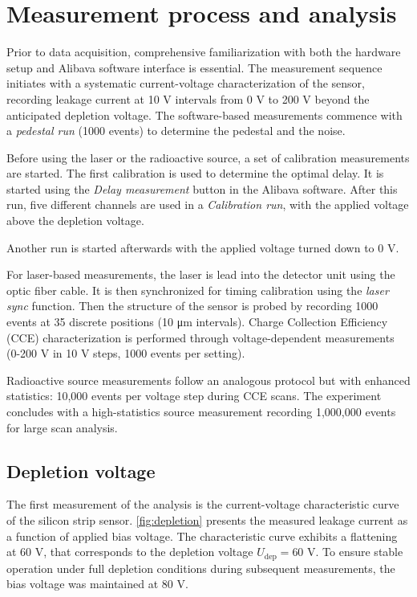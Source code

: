 \chapter{Measurement process and analysis}\label{chap:03}

Prior to data acquisition, comprehensive familiarization with both the hardware setup and Alibava software interface is essential. The measurement sequence initiates with a systematic current-voltage characterization of the sensor, recording leakage current at 10 V intervals from 0 V to 200 V beyond the anticipated depletion voltage. The software-based measurements commence with a \textit{pedestal run} (1000 events) to determine the pedestal and the noise.

Before using the laser or the radioactive source, a set of calibration measurements are started. The first calibration is used to determine the optimal delay. It is started using the \textit{Delay measurement} button in the Alibava software. After this run, five different channels are used in a \textit{Calibration run}, with the applied voltage above the depletion voltage.

Another run is started afterwards with the applied voltage turned down to 0 V.

For laser-based measurements, the laser is lead into the detector unit using the optic fiber cable. It is then synchronized for timing calibration using the \textit{laser sync} function.
Then the structure of the sensor is probed by recording 1000 events at 35 discrete positions (10 μm intervals). Charge Collection Efficiency (CCE) characterization is performed through voltage-dependent measurements (0-200 V in 10 V steps, 1000 events per setting).

Radioactive source measurements follow an analogous protocol but with enhanced statistics: 10,000 events per voltage step during CCE scans. The experiment concludes with a high-statistics source measurement recording 1,000,000 events for large scan analysis.
\newpage
\section{Depletion voltage}

The first measurement of the analysis is the current-voltage characteristic curve of the silicon strip sensor. \autoref{fig:depletion} presents the measured leakage current as a function of applied bias voltage. The characteristic curve exhibits a flattening at 60 V, that corresponds to the depletion voltage $U_{\text{dep}} = 60$ V. To ensure stable operation under full depletion conditions during subsequent measurements, the bias voltage was maintained at 80 V.

